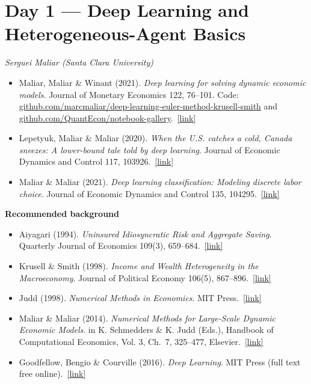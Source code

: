 \documentclass[11pt]{article}
\newcommand{\reading}[5]{%
  \item #1. \textit{#2}. #3.\ \href{#4}{[link]}%
}
\newcommand{\bglabel}{\smallskip\noindent\textbf{\color{accent}Recommended background}\par\nopagebreak\smallskip}
\begin{document}
\section*{Day 1 --- Deep Learning and Heterogeneous-Agent Basics}
\textit{Serguei Maliar (Santa Clara University)}
\smallskip

\begin{itemize}
  \reading{Maliar, Maliar \& Winant (2021)}{Deep learning for solving dynamic economic models}{Journal of Monetary Economics 122, 76--101. Code: \href{https://github.com/marcmaliar/deep-learning-euler-method-krusell-smith}{github.com/\allowbreak marcmaliar/\allowbreak deep-learning-euler-method-krusell-smith} and \href{https://github.com/QuantEcon/notebook-gallery/blob/main/ipynb/pablo_winant-dl_notebook.ipynb}{github.com/\allowbreak QuantEcon/\allowbreak notebook-gallery}}{https://doi.org/10.1016/j.jmoneco.2021.07.004}{}
  \reading{Lepetyuk, Maliar \& Maliar (2020)}{When the U.S. catches a cold, Canada sneezes: A lower-bound tale told by deep learning}{Journal of Economic Dynamics and Control 117, 103926}{https://ideas.repec.org/a/eee/dyncon/v117y2020ics0165188920300944.html}{}
  \reading{Maliar \& Maliar (2021)}{Deep learning classification: Modeling discrete labor choice}{Journal of Economic Dynamics and Control 135, 104295}{https://ideas.repec.org/a/eee/dyncon/v135y2022ics016518892100230x.html}{}
\end{itemize}

\bglabel
\begin{itemize}
  \reading{Aiyagari (1994)}{Uninsured Idiosyncratic Risk and Aggregate Saving}{Quarterly Journal of Economics 109(3), 659--684}{https://academic.oup.com/qje/article-abstract/109/3/659/1838287}{The foundational discrete-time, incomplete-markets heterogeneous-agent model behind the discrete-time HA lecture.}
  \reading{Krusell \& Smith (1998)}{Income and Wealth Heterogeneity in the Macroeconomy}{Journal of Political Economy 106(5), 867--896}{https://doi.org/10.1086/250034}{The classic heterogeneous-agent model with aggregate risk; its curse of dimensionality is exactly what the deep-learning solvers are designed to overcome.}
  \reading{Judd (1998)}{Numerical Methods in Economics}{MIT Press}{https://mitpress.mit.edu/9780262100717/numerical-methods-in-economics/}{}
  \reading{Maliar \& Maliar (2014)}{Numerical Methods for Large-Scale Dynamic Economic Models}{in K. Schmedders \& K. Judd (Eds.), Handbook of Computational Economics, Vol. 3, Ch.~7, 325--477, Elsevier}{https://www.sciencedirect.com/science/article/abs/pii/B9780444529800000074}{}
  \reading{Goodfellow, Bengio \& Courville (2016)}{Deep Learning}{MIT Press (full text free online)}{https://www.deeplearningbook.org/}{The canonical deep-learning textbook. Skim Part~I and Chapters 6--8 (feedforward networks, regularization, optimization/SGD).}
\end{itemize}
\end{document}
